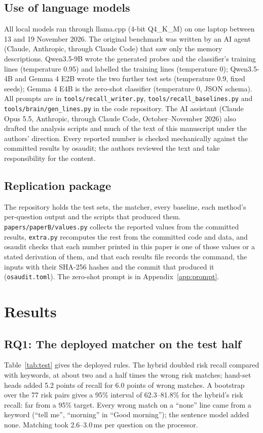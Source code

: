\documentclass[sn-mathphys-num]{sn-jnl}
\begin{document}
\subsection{Use of language models}
All local models ran through llama.cpp \cite{llamacpp} (4-bit Q4\_K\_M) on one laptop between 13 and 19 November 2026. The original benchmark was written by
an AI agent (Claude, Anthropic, through Claude Code) that saw only the memory descriptions. Qwen3.5-9B \cite{qwen35card} wrote the generated probes and the
classifier's training lines (temperature 0.95) and labelled the training lines (temperature 0); Qwen3.5-4B and Gemma 4 E2B wrote the two
further test sets (temperature 0.9, fixed seeds); Gemma 4 E4B \cite{gemma4card} is the zero-shot classifier (temperature 0, JSON schema). All prompts are in
\texttt{tools/recall\_writer.py}, \texttt{tools/recall\_baselines.py} and \texttt{tools/brain/gen\_lines.py} in the code repository. The AI
assistant (Claude Opus 5.5, Anthropic, through Claude Code, October--November 2026) also drafted the analysis scripts and much of the text of
this manuscript under the authors' direction. Every reported number is checked mechanically against the committed results by osaudit; the authors reviewed the text and
take responsibility for the content.

\subsection{Replication package}
The repository holds the test sets, the matcher, every baseline, each method's per-question output and the scripts that produced them.
\texttt{papers/paperB/values.py} collects the reported values from the committed results, \texttt{extra.py} recomputes the rest
from the committed code and data, and osaudit \cite{osaudit} checks that each number printed in this paper is one of those values or a
stated derivation of them, and that each results file records the command, the inputs with their SHA-256 hashes and the commit that
produced it (\texttt{osaudit.toml}). The zero-shot prompt is in Appendix~\ref{app:prompt}.

\section{Results}\label{sec:results}

\subsection{RQ1: The deployed matcher on the test half}
Table~\ref{tab:test} gives the deployed rules. The hybrid doubled risk recall compared with keywords, at about two and a half times the wrong
risk matches; hand-set heads added 5.2 points of recall for 6.0 points of wrong matches. A bootstrap over the 77 risk pairs gives a 95\% interval
of 62.3--81.8\% for the hybrid's risk recall: far from a 95\% target. Every wrong match on a ``none'' line came from a keyword (``tell me'',
``morning'' in ``Good morning''); the sentence model added none. Matching took 2.6--3.0\,ms per question on the processor.
\end{document}
